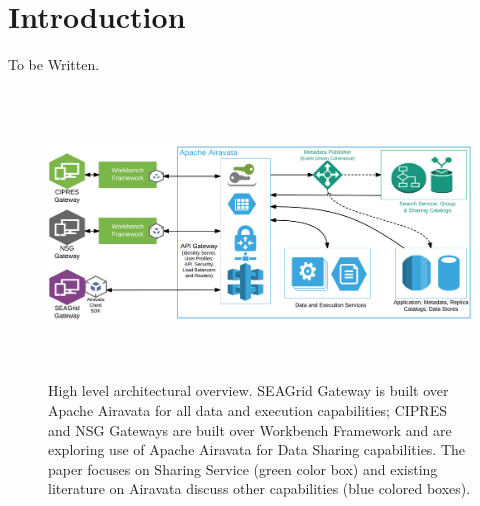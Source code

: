 \documentclass[sigconf]{acmart}
\begin{document}


\maketitle

\section{Introduction}

To be Written.

\begin{figure}
\includegraphics[height=3in, width=7in]{figures/gateway-integaration-overview.pdf}
\caption{High level architectural overview. SEAGrid Gateway is built over Apache Airavata for all data and execution capabilities; CIPRES and NSG Gateways are built over Workbench Framework and are exploring use of Apache Airavata for Data Sharing capabilities. The paper focuses on Sharing Service (green color box) and existing literature on Airavata discuss other capabilities (blue colored boxes).}
\end{figure}
\end{document}

